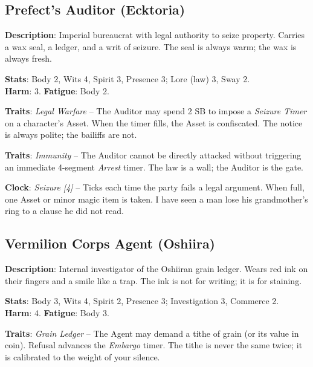 \subsection*{Prefect's Auditor (Ecktoria)}

\noindent\textbf{Description}: Imperial bureaucrat with legal authority to seize property. Carries a wax seal, a ledger, and a writ of seizure. The seal is always warm; the wax is always fresh.

\noindent\textbf{Stats}: Body 2, Wits 4, Spirit 3, Presence 3; Lore (law) 3, Sway 2.\\
\textbf{Harm}: 3. \textbf{Fatigue}: Body 2.

\noindent\textbf{Traits}: \emph{Legal Warfare} -- The Auditor may spend 2 SB to impose a \emph{Seizure Timer } on a character's Asset. When the timer fills, the Asset is confiscated. The notice is always polite; the bailiffs are not.

\noindent\textbf{Traits}: \emph{Immunity} -- The Auditor cannot be directly attacked without triggering an immediate 4-segment \emph{Arrest} timer. The law is a wall; the Auditor is the gate.

\noindent\textbf{Clock}: \emph{Seizure [4]} -- Ticks each time the party fails a legal argument. When full, one Asset or minor magic item is taken. I have seen a man lose his grandmother's ring to a clause he did not read.


\subsection*{Vermilion Corps Agent (Oshiira)}

\noindent\textbf{Description}: Internal investigator of the Oshiiran grain ledger. Wears red ink on their fingers and a smile like a trap. The ink is not for writing; it is for staining.

\noindent\textbf{Stats}: Body 3, Wits 4, Spirit 2, Presence 3; Investigation 3, Commerce 2.\\
\textbf{Harm}: 4. \textbf{Fatigue}: Body 3.

\noindent\textbf{Traits}: \emph{Grain Ledger} -- The Agent may demand a tithe of grain (or its value in coin). Refusal advances the \emph{Embargo} timer. The tithe is never the same twice; it is calibrated to the weight of your silence.

